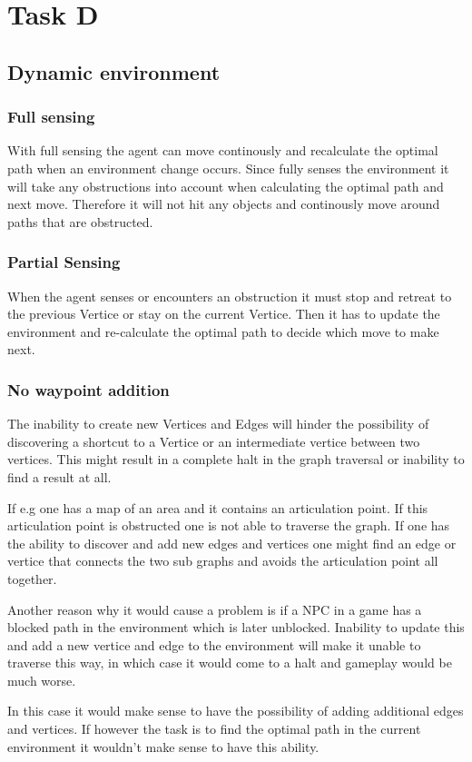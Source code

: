 
\chapter{Task D}
\section{Dynamic environment}

\subsection{Full sensing}
With full sensing the agent can move continously and recalculate the optimal
path when an environment change occurs. Since fully senses the environment it
will take any obstructions into account when calculating the optimal path and
next move. Therefore it will not hit any objects and continously move around
paths that are obstructed.


\subsection{Partial Sensing}
When the agent senses or encounters an obstruction it must stop and retreat to
the previous Vertice or stay on the current Vertice. Then it has to update the 
environment and re-calculate the optimal path to decide which move to make next.

\subsection{No waypoint addition}
The inability to create new Vertices and Edges will hinder the possibility of
discovering a shortcut to a Vertice or an intermediate vertice between two
vertices.  This might result in a complete halt in the graph traversal or
inability to find a result at all.

If e.g one has a map of an area and it contains an articulation point. If this
articulation point is obstructed one is not able to traverse the graph. If one
has the ability to discover and add new edges and vertices one might find an
edge or vertice that connects the two sub graphs and avoids the articulation
point all together.

Another reason why it would cause a problem is if a NPC in a game has a blocked
path in the environment which is later unblocked. Inability to update this and
add a new vertice and edge to the environment will make it unable to traverse
this way, in which case it would come to a halt and gameplay would be much
worse.

In this case it would make sense to have the possibility of adding additional
edges and vertices.  If however the task is to find the optimal path in the
current environment it wouldn't make sense to have this ability.





